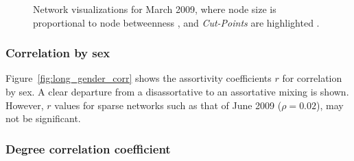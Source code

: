 \begin{figure}[htpb]%
	\centering 
	
	\qquad 			
	\caption[Network visualizations for March 2009]{Network visualizations for March 2009, where node size is proportional to node betweenness , and \textit{Cut-Points} are highlighted .}
	 \label{fig:graphs_march}
\end{figure} 


\subsubsection{Correlation by sex}

Figure~\ref{fig:long_gender_corr} shows the assortivity coefficients $r$ for correlation by sex. A clear departure from a disassortative to an assortative mixing is shown. However, $r$ values for sparse networks such as that of June 2009 ($\rho = 0.02$), may not be significant. 

\subsubsection{Degree correlation coefficient}

